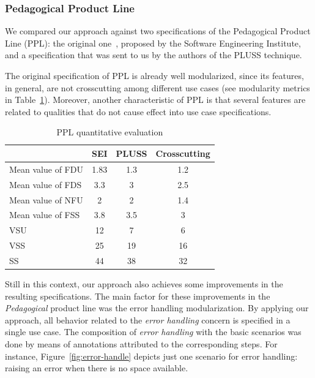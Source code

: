 \documentclass{acm_proc_article-sp}
\begin{document}
\subsubsection{Pedagogical Product Line}

We compared our approach against two specifications of the Pedagogical Product Line (PPL): the original one~\cite{ppl-url}, proposed by the Software Engineering Institute, and a specification that was sent to us by the authors of the PLUSS technique. 

The original specification of PPL is already well modularized, since its features, in general, are not crosscutting among different use cases (see modularity metrics in Table~\ref{tab:ppl-metrics}). Moreover, another characteristic of PPL is that several features are related to qualities that do not cause effect into use case specifications. 

\begin{table}[hb]
\centering
\caption{PPL quantitative evaluation}
\label{tab:ppl-metrics}
\begin{small}
\begin{tabular}{lccc} \hline
					& SEI 	& PLUSS 	& Crosscutting	\\ \hline
Mean value of FDU 		& 1.83	& 1.3	& 1.2	\\
Mean value of FDS 		& 3.3	& 3		& 2.5	\\
Mean value of NFU 		& 2		& 2		& 1.4	\\
Mean value of FSS 		& 3.8	& 3.5	& 3		\\ 
VSU 					& 12		& 7		& 6		\\
VSS 					& 25		& 19		& 16		\\
SS 					& 44		& 38		& 32		\\	\hline
\end{tabular}
\end{small}
\end{table}

Still in this context, our approach also achieves some improvements in the resulting specifications. The main factor for these improvements in the \emph{Pedagogical} product line was the error handling modularization. By applying our approach, all behavior related to the \emph{error handling} concern is specified in a single use case. The composition of \emph{error handling} with the basic scenarios was done by means of annotations attributed to the corresponding steps. For instance, Figure~\ref{fig:error-handle} depicts just one scenario for error handling: raising  an error when there is no space available. 
\end{document}
